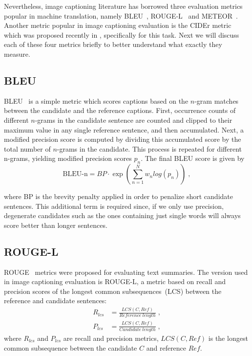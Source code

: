 Nevertheless, image captioning literature has borrowed three evaluation metrics
popular in machine translation, namely BLEU~\cite{Papineni:BLEU},
ROUGE-L~\cite{lin2004rouge} and METEOR~\cite{denkowski-lavie:2014:Meteor}.
Another metric popular in image captioning evaluation is the CIDEr metric which
was proposed recently in \cite{Vedantam_2015_CVPR}, specifically for this task.
Next we will discuss each of these four metrics briefly to better understand
what exactly they measure.

\subsection{BLEU}

BLEU~\cite{Papineni:BLEU} is a simple metric which scores captions based on the
$n$-gram matches between the candidate and the reference captions.
First, occurrence counts of different $n$-grams in the candidate sentence are
counted and clipped to their maximum value in any single reference sentence,
and then accumulated.
Next, a modified precision score is computed by dividing this accumulated score
by the total number of $n$-grams in the candidate.
This process is repeated for different n-grams, yielding modified precision
scores $p_n$.
The final BLEU score is given by
\begin{equation}
    \text{BLEU-n} = BP\cdot{}\exp(\sum_{n=1}^{N}w_{n}log(p_n)) \; ,
\end{equation}

\noindent where BP is the brevity penalty applied in order to penalize
short candidate sentences.
This additional term is required since, if we only use precision, degenerate
candidates such as the ones containing just single words will always score
better than longer sentences.
\subsection{ROUGE-L}
ROUGE~\cite{lin2004rouge} metrics were proposed for evaluating text summaries.
The version used in image captioning evaluation is ROUGE-L, a metric based on
recall and precision scores of the longest common subsequences~(LCS) between the
reference and candidate sentences:
\begin{align}
        R_{lcs} &= \frac{LCS(C,Ref)}{Reference\ length} \; ,\\[0.75ex]
        P_{lcs} &= \frac{LCS(C,Ref)}{Candidate\ length} \; ,
\end{align}
\noindent where $R_{lcs}$ and $P_{lcs}$ are recall and precision metrics,
$LCS(C,Ref)$ is the longest common subsequence between the candidate $C$ and reference
$Ref$.


